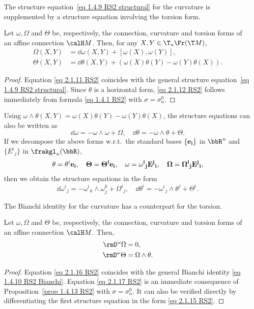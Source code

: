 The structure equation~\ref{eq 1.4.9 RS2 structural} for the curvature is supplemented by a structure equation involving the torsion form.

\begin{prop}\label{prop 2.1.11 RS2}
    Let $\omega,\Omega$ and $\Theta$ be, respectively, the connection, curvature and torsion forms of an affine connection $\calH M$. Then, for any $X,Y\in \T_u \Fr(\T M)$,
    \begin{align}
        \Omega(X,Y)&= \dd\omega(X,Y)+[\omega(X),\omega(Y)],\label{eq 2.1.11 RS2}\\
        \Theta(X,Y)&= \dd\theta(X,Y)+(\omega(X)\theta(Y)-\omega(Y)\theta(X)).\label{eq 2.1.12 RS2}
    \end{align}
\end{prop}
\begin{proof}
    Equation \eqref{eq 2.1.11 RS2} coincides with the general structure equation~\eqref{eq 1.4.9 RS2 structural}. Since $\theta$ is a horizontal form, \eqref{eq 2.1.12 RS2} follows immediately from formula \eqref{eq 1.4.1 RS2} with $\sigma=\sigma_n^0$.
\end{proof}

\begin{rem}
    Using $\omega\wedge\theta(X,Y)=\omega(X)\theta(Y)-\omega(Y)\theta(X)$, the structure equations can also be written as
    \[\dd\omega=-\omega\wedge\omega+\Omega,\quad \dd\theta=-\omega\wedge\theta+\Theta.\]
    If we decompose the above forms w.r.t.\ the standard bases $\{\bf{e}_i\}$ in $\bbR^n$ and $\{E^i{}_j\}$ in $\frakgl_n(\bbR)$,
    \[\theta=\theta^i\bf{e}_i,\quad \Theta=\Theta^i\bf{e}_i,\quad \omega=\omega^i{}_j E^j{}_i,\quad \Omega=\Omega^i{}_j E^j{}_i,\label{eq 2.1.14 RS2}\]
    then we obtain the structure equations in the form
    \[\dd\omega^i{}_j=-\omega^i{}_k\wedge \omega^k_j+\Omega^i{}_j,\quad \dd\theta^i=-\omega^i{}_j\wedge \theta^j+\Theta^i.\label{eq 2.1.15 RS2}\]
\end{rem}

The Bianchi identity for the curvature has a counterpart for the torsion.

\begin{prop}\label{prop 2.1.13 RS2}
    Let $\omega,\Omega$ and $\Theta$ be, respectively, the connection, curvature and torsion forms of an affine connection $\calH M$. Then,
    \begin{align}
        \rmD^\omega\Omega&=0,\label{eq 2.1.16 RS2}\\
        \rmD^\omega\Theta&=\Omega\wedge\theta.\label{eq 2.1.17 RS2}
    \end{align}
\end{prop}
\begin{proof}
    Equation \eqref{eq 2.1.16 RS2} coincides with the general Bianchi identity \eqref{eq 1.4.10 RS2 Bianchi}. Equation \eqref{eq 2.1.17 RS2} is an immediate consequence of Proposition~\ref{prop 1.4.13 RS2} with $\sigma=\sigma_n^0$. It can also be verified directly by differentiating the first structure equation in the form \eqref{eq 2.1.15 RS2}.
\end{proof}


